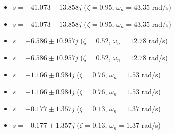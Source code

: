 \begin{itemize}
    \item $s = -41.073 \pm 13.858j$ ($\zeta=0.95$, $\omega_n=43.35$ rad/s)
    \item $s = -41.073 \pm 13.858j$ ($\zeta=0.95$, $\omega_n=43.35$ rad/s)
    \item $s = -6.586 \pm 10.957j$ ($\zeta=0.52$, $\omega_n=12.78$ rad/s)
    \item $s = -6.586 \pm 10.957j$ ($\zeta=0.52$, $\omega_n=12.78$ rad/s)
    \item $s = -1.166 \pm 0.984j$ ($\zeta=0.76$, $\omega_n=1.53$ rad/s)
    \item $s = -1.166 \pm 0.984j$ ($\zeta=0.76$, $\omega_n=1.53$ rad/s)
    \item $s = -0.177 \pm 1.357j$ ($\zeta=0.13$, $\omega_n=1.37$ rad/s)
    \item $s = -0.177 \pm 1.357j$ ($\zeta=0.13$, $\omega_n=1.37$ rad/s)
\end{itemize}
